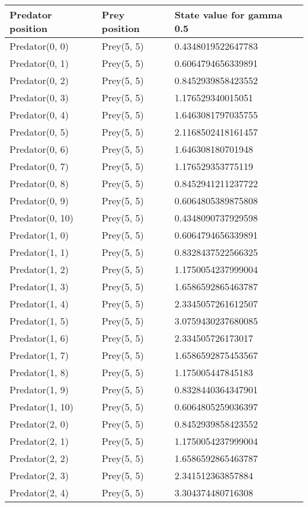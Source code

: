 \begin{longtable}{| p{} | p{} | p{} |} 
   Predator position & Prey position & State value for gamma 0.5 \\
    \hline
Predator(0, 0) & Prey(5, 5) &0.4348019522647783\\
Predator(0, 1) & Prey(5, 5) &0.6064794656339891\\
Predator(0, 2) & Prey(5, 5) &0.8452939858423552\\
Predator(0, 3) & Prey(5, 5) &1.176529340015051\\
Predator(0, 4) & Prey(5, 5) &1.6463081797035755\\
Predator(0, 5) & Prey(5, 5) &2.1168502418161457\\
Predator(0, 6) & Prey(5, 5) &1.646308180701948\\
Predator(0, 7) & Prey(5, 5) &1.176529353775119\\
Predator(0, 8) & Prey(5, 5) &0.8452941211237722\\
Predator(0, 9) & Prey(5, 5) &0.6064805389875808\\
Predator(0, 10) & Prey(5, 5) &0.4348090737929598\\
Predator(1, 0) & Prey(5, 5) &0.6064794656339891\\
Predator(1, 1) & Prey(5, 5) &0.8328437522566325\\
Predator(1, 2) & Prey(5, 5) &1.1750054237999004\\
Predator(1, 3) & Prey(5, 5) &1.6586592865463787\\
Predator(1, 4) & Prey(5, 5) &2.3345057261612507\\
Predator(1, 5) & Prey(5, 5) &3.0759430237680085\\
Predator(1, 6) & Prey(5, 5) &2.334505726173017\\
Predator(1, 7) & Prey(5, 5) &1.6586592875453567\\
Predator(1, 8) & Prey(5, 5) &1.175005447845183\\
Predator(1, 9) & Prey(5, 5) &0.8328440364347901\\
Predator(1, 10) & Prey(5, 5) &0.6064805259036397\\
Predator(2, 0) & Prey(5, 5) &0.8452939858423552\\
Predator(2, 1) & Prey(5, 5) &1.1750054237999004\\
Predator(2, 2) & Prey(5, 5) &1.6586592865463787\\
Predator(2, 3) & Prey(5, 5) &2.341512363857884\\
Predator(2, 4) & Prey(5, 5) &3.304374480716308\\

\end{longtable}

